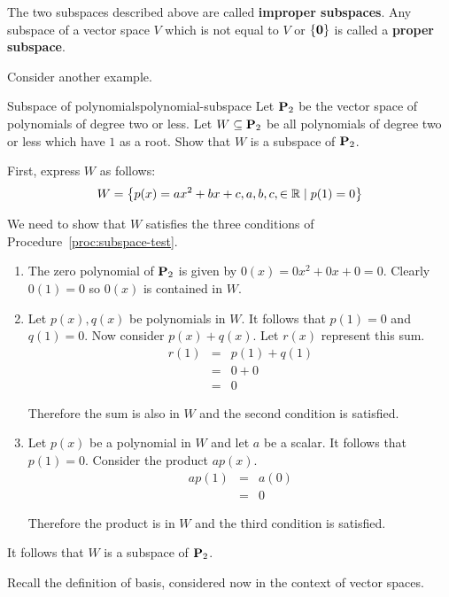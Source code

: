 The two subspaces described above are called \textbf{improper subspaces}. Any subspace of a vector space $V$ which is not equal to $V$ or  $\left\{\mbox{\bf 0} \right\}$ is called a \textbf{proper subspace}.

Consider another example.

\begin{example}{Subspace of polynomials}{polynomial-subspace}
Let $\mathbf{P}_2$ be the vector space of polynomials of degree two or less. Let $W \subseteq \mathbf{P}_2$ be all polynomials of degree two or less which have $1$ as a root. Show that $W$ is a subspace of $\mathbf{P}_2$.
\end{example}

\begin{solution}
First, express $W$ as follows:
\[
W = \left\{p(x) = ax^2 +bx +c, a,b,c, \in \mathbb{R} \mid p(1)  = 0 \right\}
\]

We need to show that $W$ satisfies the three conditions of Procedure~\ref{proc:subspace-test}.
\begin{enumerate}
\item
The zero polynomial of $\mathbf{P}_2$ is given by $0(x) = 0x^2 + 0x + 0 = 0$. Clearly $0(1) = 0$ so $0(x)$ is contained in $W$.

\item
Let $p(x), q(x)$ be polynomials in $W$.  It follows that $p(1) = 0 $ and $q(1) = 0$. Now consider $p(x) + q(x)$. Let $r(x)$ represent this sum.
\begin{eqnarray*}
r(1) &=& p(1) + q(1) \\
&=& 0 + 0 \\
&=& 0
\end{eqnarray*}

Therefore the sum is also in $W$ and the second condition is satisfied.

\item
Let $p(x)$ be a polynomial in $W$ and let $a$ be a scalar. It follows that $p(1) = 0$. Consider the product $ap(x)$.
\begin{eqnarray*}
ap(1) &=& a(0) \\
&=& 0
\end{eqnarray*}

Therefore the product is in $W$ and the third condition is satisfied.
\end{enumerate}

It follows that $W$ is a subspace of $\mathbf{P}_2$.
\end{solution}

Recall the definition of basis, considered now in the context of vector spaces.

